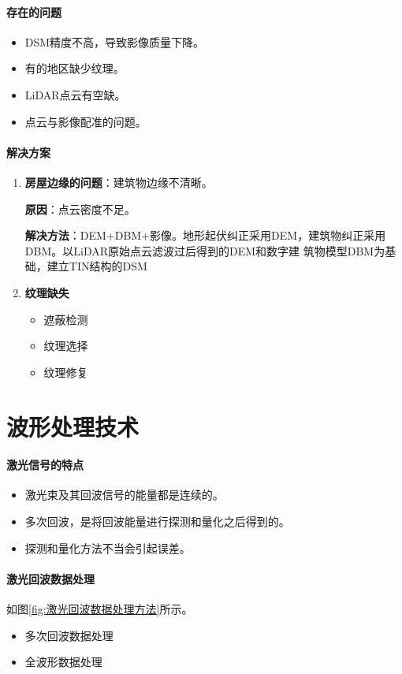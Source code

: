 \paragraph{存在的问题}
\begin{itemize}
	\item DSM精度不高，导致影像质量下降。
	\item 有的地区缺少纹理。
	\item LiDAR点云有空缺。
	\item 点云与影像配准的问题。
\end{itemize}

\paragraph{解决方案}
\begin{enumerate}
	\item \textbf{房屋边缘的问题}：建筑物边缘不清晰。
	
		\textbf{原因}：点云密度不足。
		
		\textbf{解决方法}：DEM+DBM+影像。地形起伏纠正采用DEM，建筑物纠正采用DBM。以LiDAR原始点云滤波过后得到的DEM和数字建
			筑物模型DBM为基础，建立TIN结构的DSM
	\item \textbf{纹理缺失}
		\begin{itemize}
			\item 遮蔽检测
			\item 纹理选择
			\item 纹理修复
		\end{itemize}
\end{enumerate}

\section{波形处理技术}

\paragraph{激光信号的特点}
\begin{itemize}
	\item 激光束及其回波信号的能量都是连续的。
	\item 多次回波，是将回波能量进行探测和量化之后得到的。 
	\item 探测和量化方法不当会引起误差。
\end{itemize}

\paragraph{激光回波数据处理}如图\ref{fig:激光回波数据处理方法}所示。
\begin{itemize}
	\item 多次回波数据处理
	\item 全波形数据处理
\end{itemize}

